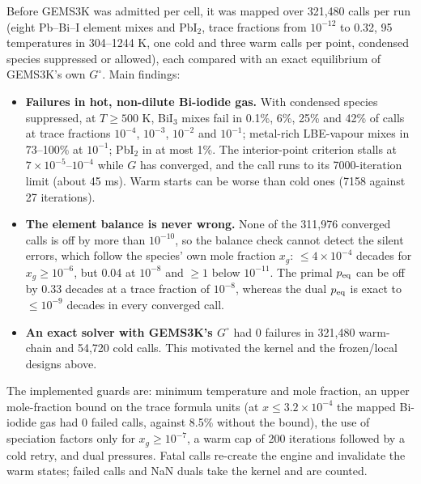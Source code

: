 \documentclass[11pt,a4paper]{article}
\begin{document}
Before GEMS3K was admitted per cell, it was mapped over 321,480 calls per
run (eight Pb--Bi--I element mixes and PbI$_2$, trace fractions from
$10^{-12}$ to 0.32, 95 temperatures in 304--1244 K, one cold and three
warm calls per point, condensed species suppressed or allowed), each
compared with an exact equilibrium of GEMS3K's own $G^\circ$. Main
findings:
\begin{itemize}
\item \textbf{Failures in hot, non-dilute Bi-iodide gas.} With condensed
  species suppressed, at $T\ge500$ K, BiI$_3$ mixes fail in 0.1\%,
  6\%, 25\% and 42\% of calls at trace fractions $10^{-4}$, $10^{-3}$,
  $10^{-2}$ and $10^{-1}$; metal-rich LBE-vapour mixes in 73--100\% at
  $10^{-1}$; PbI$_2$ in at most 1\%. The interior-point criterion stalls
  at $7\times10^{-5}$--$10^{-4}$ while $G$ has converged, and the call runs
  to its 7000-iteration limit (about 45 ms). Warm starts can be worse
  than cold ones (7158 against 27 iterations).
\item \textbf{The element balance is never wrong.} None of the 311,976
  converged calls is off by more than $10^{-10}$, so the balance check
  cannot detect the silent errors, which follow the species' own mole
  fraction $x_g$: $\le4\times10^{-4}$ decades for $x_g\ge10^{-6}$, but
  0.04 at $10^{-8}$ and $\ge1$ below $10^{-11}$. The primal
  $p_{\rm eq}$ can be off by 0.33 decades at a trace fraction of
  $10^{-8}$, whereas the dual $p_{\rm eq}$ is exact to $\le10^{-9}$
  decades in every converged call.
\item \textbf{An exact solver with GEMS3K's $G^\circ$} had 0 failures in
  321,480 warm-chain and 54,720 cold calls. This motivated the
  kernel and the frozen/local designs above.
\end{itemize}
The implemented guards are: minimum temperature and mole fraction, an
upper mole-fraction bound on the trace formula units (at
$x\le3.2\times10^{-4}$ the mapped Bi-iodide gas had 0 failed calls,
against 8.5\% without the bound), the use of speciation factors only for
$x_g\ge10^{-7}$, a warm cap of 200 iterations followed by a cold retry,
and dual pressures. Fatal calls re-create the engine and invalidate the
warm states; failed calls and NaN duals take the kernel and are counted.
\end{document}
